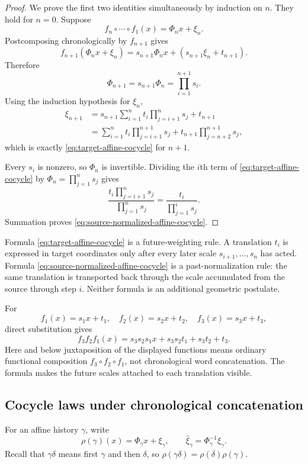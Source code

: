 \begin{proof}
We prove the first two identities simultaneously by induction on $n$.  They
hold for $n=0$.  Suppose
\[
  f_n\circ\cdots\circ f_1(x)=\Phi_nx+\xi_n.
\]
Postcomposing chronologically by $f_{n+1}$ gives
\[
  f_{n+1}(\Phi_nx+\xi_n)
  =s_{n+1}\Phi_nx+(s_{n+1}\xi_n+t_{n+1}).
\]
Therefore
\[
  \Phi_{n+1}=s_{n+1}\Phi_n
  =\prod_{i=1}^{n+1}s_i.
\]
Using the induction hypothesis for $\xi_n$,
\begin{align*}
  \xi_{n+1}
  &=s_{n+1}\sum_{i=1}^{n}t_i
       \prod_{j=i+1}^{n}s_j+t_{n+1}\\
  &=\sum_{i=1}^{n}t_i
       \prod_{j=i+1}^{n+1}s_j
    +t_{n+1}\prod_{j=n+2}^{n+1}s_j,
\end{align*}
which is exactly \eqref{eq:target-affine-cocycle} for $n+1$.

Every $s_i$ is nonzero, so $\Phi_n$ is invertible.  Dividing the $i$th term of
\eqref{eq:target-affine-cocycle} by
$\Phi_n=\prod_{j=1}^{n}s_j$ gives
\[
  \frac{t_i\prod_{j=i+1}^{n}s_j}
       {\prod_{j=1}^{n}s_j}
  =\frac{t_i}{\prod_{j=1}^{i}s_j}.
\]
Summation proves \eqref{eq:source-normalized-affine-cocycle}.
\end{proof}

Formula \eqref{eq:target-affine-cocycle} is a future-weighting rule.  A
translation $t_i$ is expressed in target coordinates only after every later
scale $s_{i+1},\ldots,s_n$ has acted.  Formula
\eqref{eq:source-normalized-affine-cocycle} is a past-normalization rule: the
same translation is transported back through the scale accumulated from the
source through step $i$.  Neither formula is an additional geometric
postulate.

\begin{example}
For
\[
  f_1(x)=s_1x+t_1,
  \quad f_2(x)=s_2x+t_2,
  \quad f_3(x)=s_3x+t_3,
\]
direct substitution gives
\[
  f_3f_2f_1(x)
  =s_3s_2s_1x+s_3s_2t_1+s_3t_2+t_3.
\]
Here and below juxtaposition of the displayed functions means ordinary
functional composition $f_3\circ f_2\circ f_1$, not chronological word
concatenation.  The formula makes the future scales attached to each
translation visible.
\end{example}

\subsection{Cocycle laws under chronological concatenation}

For an affine history $\gamma$, write
\[
  \rho(\gamma)(x)=\Phi_\gamma x+\xi_\gamma,
  \qquad
  \widehat\xi_\gamma=\Phi_\gamma^{-1}\xi_\gamma.
\]
Recall that $\gamma\delta$ means first $\gamma$ and then $\delta$, so
$\rho(\gamma\delta)=\rho(\delta)\rho(\gamma)$.

